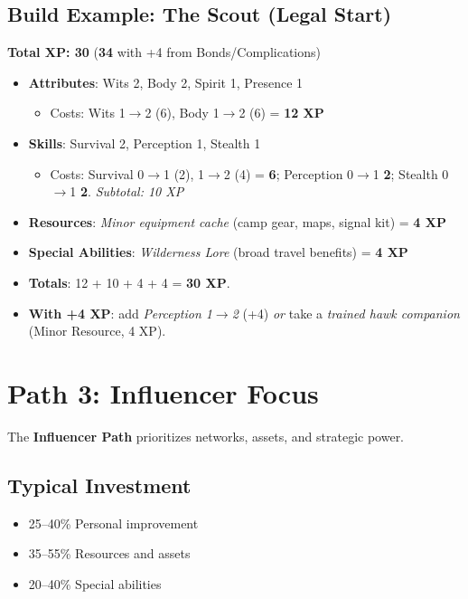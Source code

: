 \begin{multicols}{2}
\subsection*{Build Example: The Scout (Legal Start)}
\textbf{Total XP: 30} \quad (\textbf{34} with +4 from Bonds/Complications)
\begin{itemize}
\item \textbf{Attributes}: Wits 2, Body 2, Spirit 1, Presence 1
  \begin{itemize}
  \item Costs: Wits 1$\to$2 (6), Body 1$\to$2 (6) = \textbf{12 XP}
  \end{itemize}
\item \textbf{Skills}: Survival 2, Perception 1, Stealth 1
  \begin{itemize}
  \item Costs: Survival 0$\to$1 (2), 1$\to$2 (4) = \textbf{6}; Perception 0$\to$1 \textbf{2}; Stealth 0$\to$1 \textbf{2}. \emph{Subtotal: 10 XP}
  \end{itemize}
\item \textbf{Resources}: \emph{Minor equipment cache} (camp gear, maps, signal kit) = \textbf{4 XP}
\item \textbf{Special Abilities}: \emph{Wilderness Lore} (broad travel benefits) = \textbf{4 XP}
\item \textbf{Totals}: 12 + 10 + 4 + 4 = \textbf{30 XP}.
\item \textbf{With +4 XP}: add \emph{Perception 1$\to$2} (+4) \emph{or} take a \emph{trained hawk companion} (Minor Resource, 4 XP).
\end{itemize}

\section{Path 3: Influencer Focus}

The \textbf{Influencer Path} prioritizes networks, assets, and strategic power.

\subsection*{Typical Investment}
\begin{itemize}
\item 25--40\% Personal improvement
\item 35--55\% Resources and assets
\item 20--40\% Special abilities
\end{itemize}


\end{multicols}
